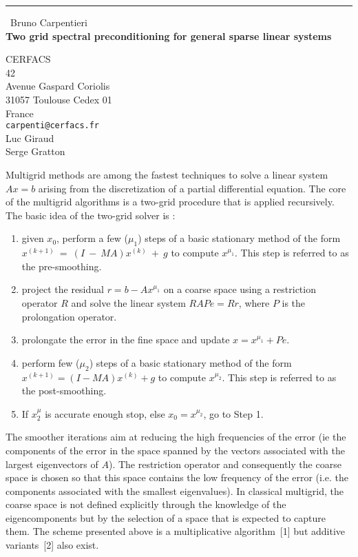 \documentclass{report}
\begin{document}
\begin{center}
\rule{6in}{1pt} \
{\large Bruno Carpentieri \\
{\bf Two grid spectral preconditioning for general sparse linear systems}}

CERFACS \\ 42 \\ Avenue Gaspard Coriolis \\ 31057 Toulouse Cedex 01 \\ France
\\
{\tt carpenti@cerfacs.fr}\\
Luc Giraud\\
Serge Gratton\end{center}

Multigrid methods are among the fastest techniques to solve a linear
system $Ax = b$ arising from the
discretization of a partial differential equation.
The core of the multigrid algorithms is a two-grid procedure that is applied recursively.
The basic idea of the two-grid solver is :
\begin{enumerate}
\item given $x_0$, perform a few ($\mu_1$) steps of a basic stationary method of
the form $x^{(k+1)}~=~(I~-~MA)x^{(k)}~+~g $ to compute $x^{\mu_1}$.
This step is referred to as the pre-smoothing.
\item project the residual $r = b- Ax^{\mu_1}$ on a coarse space using a
restriction operator $R$ and solve
the linear system $RAP e = R r$, where $P$ is the prolongation operator.
\item prolongate the error in the fine space and update $x = x^{\mu_1} + P e$.
\item perform few ($\mu_2$) steps of a basic stationary method of
the form $x^{(k+1)} = (I-MA)x^{(k)} + g $ to compute $x^{\mu_2}$.
This step is referred to as the post-smoothing.
\item If $x^\mu_2$ is accurate enough stop, else $x_0 = x^{\mu_2}$, go to Step 1.
\end{enumerate}
The smoother iterations aim at reducing the high frequencies of
the error (ie the components of the error in the space spanned by the vectors associated
with the largest eigenvectors of $A$).
The restriction operator and consequently the coarse space is chosen so
that this space contains the
low frequency of the error (i.e. the components associated with the
smallest eigenvalues).
In classical multigrid, the coarse space is not defined explicitly
through the knowledge of the
eigencomponents but by the selection of a space that is expected to capture them.
The scheme presented above is a multiplicative algorithm~[1] but additive
variants~[2] also exist.
\end{document}
